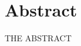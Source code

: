 


\begingroup
\let\clearpage\relax
\let\cleardoublepage\relax
\let\cleardoublepage\relax

\chapter*{Abstract}
\noindent THE ABSTRACT



\endgroup			

\vfill
